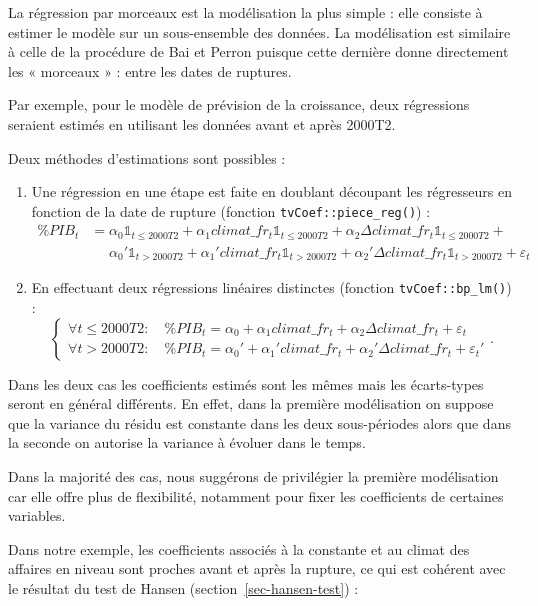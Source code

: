 \documentclass[
  a4paper,
  DIV=11,
  numbers=noendperiod,
  french]{scrartcl}
\newcommand\1{{\mathds 1}}
\theoremstyle{remark}
\begin{document}
La régression par morceaux est la modélisation la plus simple : elle
consiste à estimer le modèle sur un sous-ensemble des données. La
modélisation est similaire à celle de la procédure de Bai et Perron
puisque cette dernière donne directement les « morceaux » : entre les
dates de ruptures.

Par exemple, pour le modèle de prévision de la croissance, deux
régressions seraient estimés en utilisant les données avant et après
2000T2.

Deux méthodes d'estimations sont possibles :

\begin{enumerate}
\def\labelenumi{\arabic{enumi}.}
\item
  Une régression en une étape est faite en doublant découpant les
  régresseurs en fonction de la date de rupture (fonction
  \texttt{tvCoef::piece\_reg()}) : \begin{align*}
  \% PIB_t &= \alpha_0\1_{t\leq 2000T2} + \alpha_1 climat\_fr_t\1_{t\leq 2000T2} + \alpha_2 \Delta climat\_fr_t\1_{t\leq 2000T2} + \\
  &\phantom{=} \alpha_0'\1_{t > 2000T2} + \alpha_1' climat\_fr_t\1_{t > 2000T2} + \alpha_2' \Delta climat\_fr_t\1_{t > 2000T2} + \varepsilon_t
  \end{align*}
\item
  En effectuant deux régressions linéaires distinctes (fonction
  \texttt{tvCoef::bp\_lm()}) : \[
  \begin{cases}
  \forall t \leq 2000T2 :\quad \% PIB_t = \alpha_0 + \alpha_1 climat\_fr_t + \alpha_2 \Delta climat\_fr_t + \varepsilon_t \\
  \forall t > 2000T2 :\quad \% PIB_t = \alpha_0' + \alpha_1' climat\_fr_t + \alpha_2' \Delta climat\_fr_t + \varepsilon_t'
  \end{cases}.
  \]
\end{enumerate}

Dans les deux cas les coefficients estimés sont les mêmes mais les
écarts-types seront en général différents. En effet, dans la première
modélisation on suppose que la variance du résidu est constante dans les
deux sous-périodes alors que dans la seconde on autorise la variance à
évoluer dans le temps.

Dans la majorité des cas, nous suggérons de privilégier la première
modélisation car elle offre plus de flexibilité, notamment pour fixer
les coefficients de certaines variables.

Dans notre exemple, les coefficients associés à la constante et au
climat des affaires en niveau sont proches avant et après la rupture, ce
qui est cohérent avec le résultat du test de Hansen
(section~\ref{sec-hansen-test}) :
\end{document}
